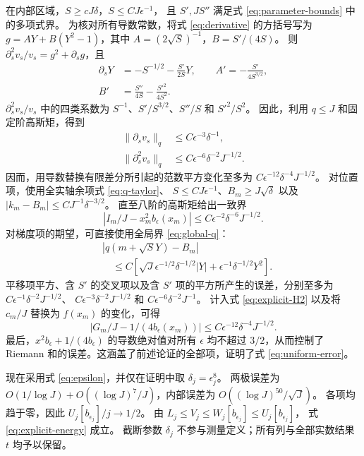 \documentclass[aps,pra,reprint,superscriptaddress,longbibliography]{revtex4-2}
\theoremstyle{remark}
\newcommand{\norm}[1]{\lVert#1\rVert}
\begin{document}
在内部区域，$S\geq cJ\delta$，$S\leq CJ\epsilon^{-1}$，
且 $S',JS''$ 满足式 \eqref{eq:parameter-bounds} 中的多项式界。
为核对所有导数常数，将式 \eqref{eq:derivative} 的方括号写为
$g=A Y+B(Y^2-1)$，其中 $A=(2\sqrt S)^{-1}$，$B=S'/(4S)$。
则 $\partial_s^2v_s/v_s=g^2+\partial_sg$，且
\begin{align*}
 \partial_sY&=-S^{-1/2}-\frac{S'}{2S}Y,\qquad
 A'=-\frac{S'}{4S^{3/2}},\\
 B'&=\frac{S''}{4S}-\frac{S'^2}{4S^2}.
\end{align*}
$\partial_s^2v_s/v_s$ 中的四类系数为
$S^{-1}$、$S'/S^{3/2}$、$S''/S$ 和 $S'^2/S^2$。
因此，利用 $q\leq J$ 和固定阶高斯矩，得到
\begin{equation}
\begin{aligned}
\norm{\partial_sv_s}_q&\leq C\epsilon^{-3}\delta^{-1},\\
\norm{\partial_s^2v_s}_q&\leq C\epsilon^{-6}\delta^{-2}J^{-1/2}.
\end{aligned}
\label{eq:explicit-H2}
\end{equation}
因而，用导数替换有限差分所引起的范数平方变化至多为
$C\epsilon^{-12}\delta^{-4}J^{-1/2}$。
对位置项，使用全实轴余项式 \eqref{eq:q-taylor}、
$S\leq CJ\epsilon^{-1}$、$B_m\geq J\sqrt\delta$
以及 $|k_m-B_m|\leq CJ^{-1}\delta^{-3/2}$。
直至八阶的高斯矩给出一致界
\begin{equation}
 \left|I_m/J-x_m^2b_\epsilon(x_m)\right|
 \leq C\epsilon^{-2}\delta^{-6}J^{-1/2}.
 \label{eq:explicit-I}
\end{equation}
对梯度项的期望，可直接使用全局界 \eqref{eq:global-q}：
\begin{align*}
 &|q(m+\sqrt S Y)-B_m|\\
 &\quad\leq C\left[\sqrt J\epsilon^{-1/2}\delta^{-1/2}|Y|
             +\epsilon^{-1}\delta^{-1/2}Y^2\right].
\end{align*}
平移项平方、含 $S'$ 的交叉项以及含 $S'$ 项的平方所产生的误差，分别至多为
$C\epsilon^{-1}\delta^{-2}J^{-1/2}$、
$C\epsilon^{-3}\delta^{-2}J^{-1/2}$ 和 $C\epsilon^{-6}\delta^{-2}J^{-1}$。
计入式 \eqref{eq:explicit-H2} 以及将 $c_m/J$ 替换为 $f(x_m)$ 的变化，可得
\begin{equation}
 \left|G_m/J-1/(4b_\epsilon(x_m))\right|
 \leq C\epsilon^{-12}\delta^{-4}J^{-1/2}.
 \label{eq:explicit-G}
\end{equation}
最后，$x^2b_\epsilon+1/(4b_\epsilon)$ 的导数绝对值对所有 $\epsilon$
均不超过 $3/2$，从而控制了 Riemann 和的误差。这涵盖了前述论证的全部项，证明了式 \eqref{eq:uniform-error}。

现在采用式 \eqref{eq:epsilon}，并仅在证明中取 $\delta_j=\epsilon_j^8$。
两极误差为 $O(1/\log J)+O((\log J)^7/J)$，内部误差为
$O((\log J)^{50}/\sqrt J)$。
各项均趋于零，因此 $U_j[b_{\epsilon_j}]/j\to1/2$。
由 $L_j\leq V_j\leq W_j[b_{\epsilon_j}]\leq U_j[b_{\epsilon_j}]$，
式 \eqref{eq:explicit-energy} 成立。
截断参数 $\delta_j$ 不参与测量定义；所有列与全部实数结果 $t$ 均予以保留。
\end{document}
